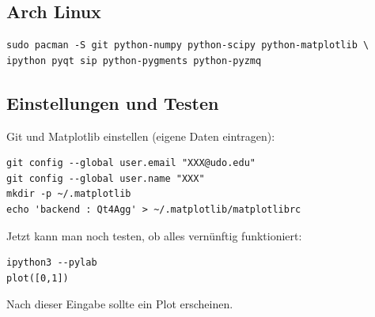 \subsection{Arch Linux}
\begin{verbatim}
sudo pacman -S git python-numpy python-scipy python-matplotlib \
ipython pyqt sip python-pygments python-pyzmq
\end{verbatim}

\subsection{Einstellungen und Testen}
\label{install-test}
Git und Matplotlib einstellen (eigene Daten eintragen):
\begin{verbatim}
git config --global user.email "XXX@udo.edu"
git config --global user.name "XXX"
mkdir -p ~/.matplotlib
echo 'backend : Qt4Agg' > ~/.matplotlib/matplotlibrc
\end{verbatim}
Jetzt kann man noch testen, ob alles vernünftig funktioniert:
\begin{verbatim}
ipython3 --pylab
plot([0,1])
\end{verbatim}
Nach dieser Eingabe sollte ein Plot erscheinen.
